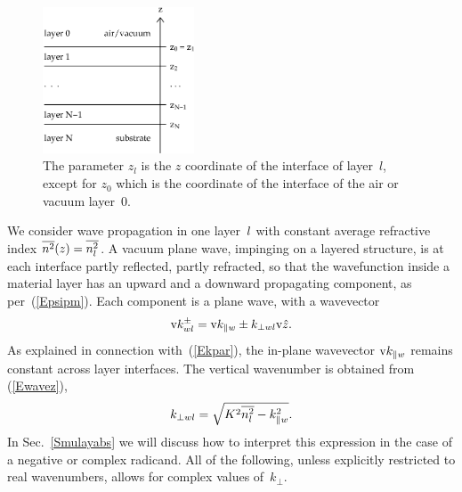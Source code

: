 \begin{figure}[tb]
\begin{center}
\includegraphics[width=0.4\textwidth]{fig/drawing/multilayer_z_conventions.ps}
\end{center}
\caption{The parameter $z_l$ is the $z$ coordinate of the  interface
%
%
%
%
of layer~$l$, except for $z_0$ which is the coordinate of the  interface
of the air or vacuum layer~0.}
\label{Fdefz}
\end{figure}

We consider wave propagation in one layer~$l$
%
with constant average refractive index $\overline{n^2}(z)=\overline{n_l^2}$.
A vacuum plane wave, impinging on a layered structure,
is at each interface partly reflected, partly refracted,
so that the wavefunction inside a material layer
has an upward and a downward propagating component,
as per~(\ref{Epsipm}).
Each component is a plane wave,
with a wavevector
\begin{equation}\label{Ekpmwj3}
  \text{v}{k}^\pm_{wl}= \text{v}{k}_{\parallel w} \pm k_{\perp wl}\text{v}{\hat z}.
\end{equation}
%
%
As explained in connection with~(\ref{Ekpar}),
the in-plane wavevector $\text{v}{k}_{\parallel w}$ remains constant
across layer interfaces.
The vertical wavenumber is obtained from (\ref{Ewavez}),
\begin{equation}\label{Ekperpwj}
  k_{\perp wl} = \sqrt{K^2 \overline{n_l^2} - k_{\parallel w}^2}.
\end{equation}
In Sec.~\ref{Smulayabs} we will discuss how to interpret this expression
in the case of a negative or complex radicand.
All of the following, unless explicitly restricted to real wavenumbers,
allows for complex values of~$k_\perp$.

